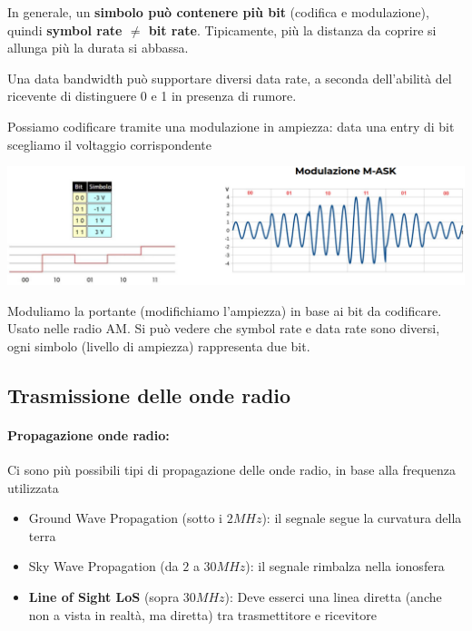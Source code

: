In generale, un \textbf{simbolo può contenere più bit} (codifica e modulazione), quindi \textbf{symbol rate $\neq$ bit rate}. Tipicamente, più la distanza da coprire si allunga più la durata si abbassa.

Una data bandwidth può supportare diversi data rate, a seconda dell'abilità del ricevente di distinguere 0 e 1 in presenza di rumore.

Possiamo codificare tramite una modulazione in ampiezza: data una entry di bit scegliamo il voltaggio corrispondente
\begin{center}
	\includegraphics[width=\linewidth]{img/wireless/modAM1}
\end{center}

Moduliamo la portante (modifichiamo l'ampiezza) in base ai bit da codificare. Usato nelle radio AM. Si può vedere che symbol rate e data rate sono diversi, ogni simbolo (livello di ampiezza) rappresenta due bit.

\subsection{Trasmissione delle onde radio}

\paragraph{Propagazione onde radio:} Ci sono più possibili tipi di propagazione delle onde radio, in base alla frequenza utilizzata
\begin{itemize}
	\item Ground Wave Propagation (sotto i $2MHz$): il segnale segue la curvatura della terra

	\item Sky Wave Propagation (da $2$ a $30MHz$): il segnale rimbalza nella ionosfera

	\item \textbf{Line of Sight LoS} (sopra $30MHz$): Deve esserci una linea diretta (anche non a vista in realtà, ma diretta) tra trasmettitore e ricevitore
\end{itemize}

